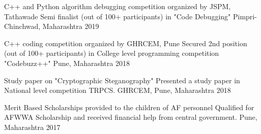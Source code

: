 

\begin{cventries}

  \cventry
    {C++ and Python algorithm debugging competition organized by JSPM, Tathawade} %
    {Semi finalist (out of 100+ participants) in "Code Debugging"} %
    {Pimpri-Chinchwad, Maharashtra} %
    {2019} %
    {}

  \cventry
    {C++ coding competition organized by GHRCEM, Pune} %
    {Secured 2nd position (out of 100+ participants) in College level programming competition "Codebuzz++"} %
    {Pune, Maharashtra} %
    {2018} %
    {}

  \cventry
    {Study paper on "Cryptographic Steganography"} %
    {Presented a study paper in National level competition TRPCS.} %
    {GHRCEM, Pune, Maharashtra} %
    {2018} %
    {}
    
  \cventry
    {Merit Based Scholarships provided to the children of AF personnel} %
    {Qualified for AFWWA Scholarship and received financial help from central government.} %
    {Pune, Maharashtra} %
    {2017} %
    {}
    
\end{cventries}

